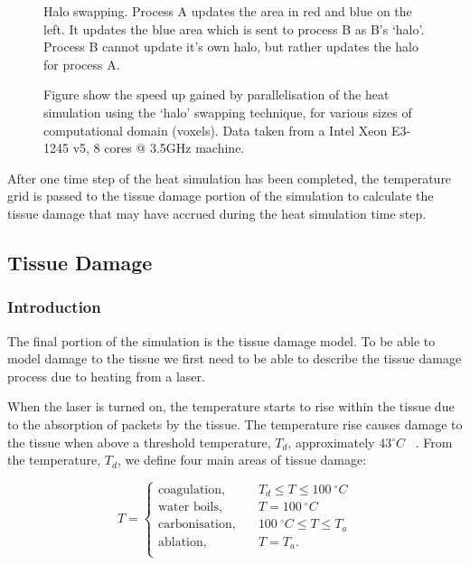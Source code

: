 
\begin{figure}
\centering
\def\svgwidth{350pt}

\caption{Halo swapping. Process A updates the area in red and blue on the left. It updates the blue area which is sent to process B as B's `halo'. Process B cannot update it's own halo, but rather updates the halo for process A.}
\label{fig:haloswap}
\end{figure}

\begin{figure}
\centering
\caption{Figure show the speed up gained by parallelisation of the heat simulation using the `halo' swapping technique, for various sizes of computational domain (voxels). Data taken from a Intel Xeon E3-1245 v5, 8 cores @ 3.5GHz machine.}
\label{fig:parallel}
\end{figure}
After one time step of the heat simulation has been completed, the temperature grid is passed to the tissue damage portion of the simulation to calculate the tissue damage that may have accrued during the heat simulation time step.
\FloatBarrier
\newpage

\subsection{Tissue Damage}
\label{sec:tissuedamage}

\subsubsection*{Introduction}
The final portion of the simulation is the tissue damage model. To be able to model damage to the tissue we first need to be able to describe the tissue damage process due to heating from a laser.

When the laser is turned on, the temperature starts to rise within the tissue due to the absorption of packets by the tissue. The temperature rise causes damage to the tissue when above a threshold temperature, $T_d$, approximately 43$^{\circ}C$~\cite{welch2011optical}%
. From the temperature, $T_d$, we define four main areas of tissue damage:


\begin{equation}
T = 
     \begin{cases}
       \text{coagulation,} &\quad T_d\leq T \leq 100~^{\circ}C\\
       \text{water boils,} &\quad T=100~^{\circ}C\\
       \text{carbonisation,} &\quad 100~^{\circ}C \leq T \leq T_a\\
       \text{ablation,} &\quad T=T_a.\\
     \end{cases}
\end{equation}


